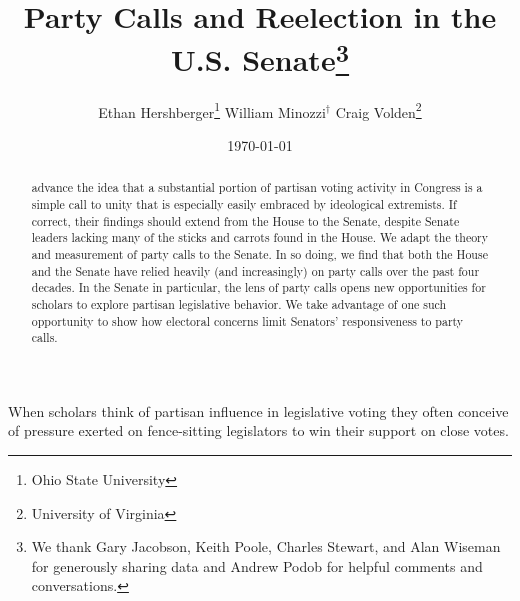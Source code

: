 \documentclass[12pt]{article}
\begin{document}


\title{Party Calls and Reelection in the U.S. Senate\thanks{
We thank Gary Jacobson, Keith Poole, Charles Stewart,
and Alan Wiseman for generously sharing data
and Andrew Podob for helpful comments and conversations.
}
}

\author{
Ethan Hershberger\thanks{
  \small Ohio State University
}\quad
William Minozzi$^\dagger$\quad
Craig Volden\thanks{
  \small University of Virginia
}\\
}

\date{\today}

\maketitle

\thispagestyle{empty}
\setcounter{page}{0}

\begin{abstract}
\doublespacing
\noindent
\cite{Minozzi:2013} advance the idea that a substantial portion of partisan voting activity in Congress is a simple call to unity that is especially easily embraced by ideological extremists.  If correct, their findings should extend from the House to the Senate, despite Senate leaders lacking many of the sticks and carrots found in the House.  We adapt the theory and measurement of party calls to the Senate.  In so doing, we find that both the House and the Senate have relied heavily (and increasingly) on party calls over the past four decades.  In the Senate in particular, the lens of party calls opens new opportunities for scholars to explore partisan legislative behavior.  We take advantage of one such opportunity to show how electoral concerns limit Senators' responsiveness to party calls.
\end{abstract}

\clearpage

\doublespacing



\noindent When scholars think of partisan influence in legislative voting they
often conceive of pressure exerted on fence-sitting legislators to win their
support on close votes.
\end{document}
